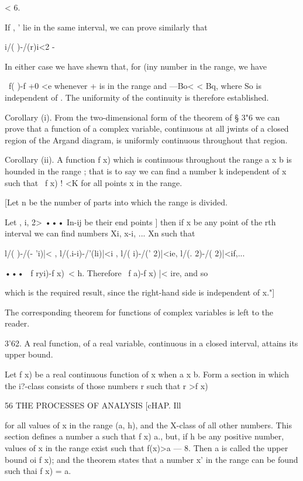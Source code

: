 < 6.

If , ' lie in the same interval, we can prove similarly that

i/( )-/(r)i<2 -

In either case we have shewn that, for (iny number in the range, we
have

\ f( )-f +0 <e whenever + is in the range and —Bo< < Bq, where So is
independent of . The uniformity of the continuity is therefore
established.

Corollary (i). From the two-dimensional form of the theorem of § 3"6
we can prove that a function of a complex variable, continuous at all
jwints of a closed region of the Argand diagram, is uniformly
continuous throughout that region.

Corollary (ii). A function f x) which is continuous throughout the
range a x b is hounded in the range ; that is to say we can find a
number k independent of x such that \ f x) ! <K for all points x in
the range.

[Let n be the number of parts into which the range is divided.

Let , i, 2> ••• In-ij be their end points ] then if x be any point of
the rth interval we can find numbers Xi, x-i, ... Xn such that

l/( )-/(- 'i)|< , l/(.i-i)-/'(li)|<i , l/( i)-/(' 2)|<ie, l/(. 2)-/(
2)|<if,...

••• \ f ryi)-f x)\ < h. Therefore \ f a)-f x) |< ire, and so

which is the required result, since the right-hand side is independent
of x."]

The corresponding theorem for functions of complex variables is left
to the reader.

3'62. A real function, of a real variable, continuous in a closed
interval, attains its upper bound.

Let f x) be a real continuous function of x when a x b. Form a section
in which the i?-class consists of those numbers r such that r >f x)



56 THE PROCESSES OF ANALYSIS [cHAP. Ill

for all values of x in the range (a, h), and the X-class of all other
numbers. This section defines a number a such that f x) a., but, if h
be any positive number, values of x in the range exist such that
f(x)>a — 8. Then a is called the upper bound oi f x); and the theorem
states that a number x' in the range can be found such thai f x) = a.

